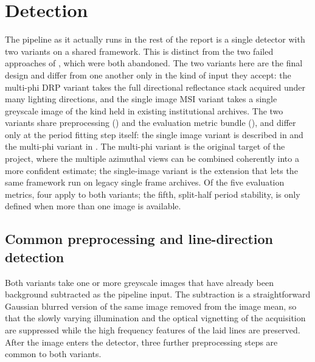 \section{Detection}
\label{sec:multiphi}


The pipeline as it actually runs in the rest of the report is a
single detector with two variants on a shared framework. This is
distinct from the two failed approaches of
, which were both abandoned. The two
variants here are the final design and differ from one another
only in the kind of input they accept: the multi-phi DRP variant
takes the full directional reflectance stack acquired under many
lighting directions, and the single image MSI variant takes a
single greyscale image of the kind held in existing institutional
archives. The two variants share preprocessing
() and the evaluation metric bundle
(), and differ only at the
period fitting step itself: the single image variant is described
in  and the multi-phi variant in
. The multi-phi variant is the original
target of the project, where the multiple azimuthal views can be
combined coherently into a more confident estimate; the
single-image variant is the extension that lets the same
framework run on legacy single frame archives. Of the five
evaluation metrics, four apply to both variants; the fifth,
split-half period stability, is only defined when more than
one image is available.

\subsection{Common preprocessing and line-direction detection}
\label{sec:multiphi:common}

Both variants take one or more greyscale images that
have already been background subtracted as the pipeline input. The subtraction is a
straightforward Gaussian blurred version of the same image removed from the image
mean, so that the slowly varying illumination and the optical
vignetting of the acquisition are suppressed while the
high frequency features of the laid lines are preserved.
After the image enters the detector, three further
preprocessing steps are common to both variants.

